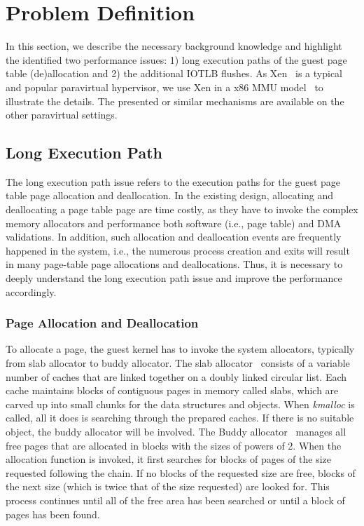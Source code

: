 \section{Problem Definition} \label{sec:prob}
In this section, we describe the necessary background knowledge and highlight the identified two performance issues: 1) long execution paths of the guest page table (de)allocation and 2) the additional IOTLB flushes.
As Xen~\cite{XEN-SOSP03} is a typical and popular paravirtual hypervisor, we use Xen in a x86 MMU model~\cite{x86-pv-model} to illustrate the details. 
The presented or similar mechanisms are available on the other paravirtual settings.
 

\subsection{Long Execution Path}\label{sec:longpath}
The long execution path issue refers to the execution paths for the guest page table page allocation and deallocation.
In the existing design, allocating and deallocating a page table page are time costly, as they have to invoke the complex memory allocators and performance both software (i.e., page table) and DMA validations.
In addition, such allocation and deallocation events are frequently happened in the system, i.e., the numerous process creation and exits will result in many page-table page allocations and deallocations.
Thus, it is necessary to deeply understand the long execution path issue and improve the performance accordingly. 

\subsubsection{Page Allocation and Deallocation}
To allocate a page, the guest kernel has to invoke the system allocators, typically from slab allocator to buddy allocator.
The slab allocator~\cite{slaballocator} consists of a variable number of caches that are linked together on a doubly linked circular list. 
Each cache maintains blocks of contiguous pages in memory called slabs, which are carved up into small chunks for the data structures and objects. 
When \emph{kmalloc} is called, all it does is searching through the prepared caches. 
If there is no suitable object, the buddy allocator will be involved.
The Buddy allocator~\cite{buddyallocator} manages all free pages that are allocated in blocks with the sizes of powers of 2.  
When the allocation function is invoked, it first searches for blocks of pages of the size requested following the chain.
If no blocks of the requested size are free, blocks of the next size (which is twice that of the size requested) are looked for. 
This process continues until all of the free area has been searched or until a block of pages has been found. 

